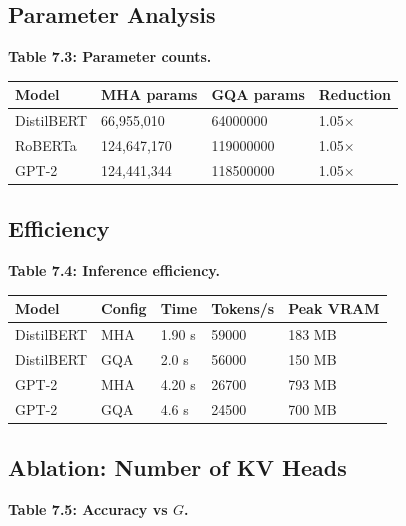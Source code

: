\subsection{Parameter Analysis}

\textbf{Table 7.3: Parameter counts.}

\begin{table}[H]
\centering
\small
\begin{tabular}{llll}
\toprule
\textbf{Model} & \textbf{MHA params} & \textbf{GQA params} & \textbf{Reduction} \\
\midrule
DistilBERT & 66,955,010 & 64000000 & 1.05$\times$ \\
RoBERTa & 124,647,170 & 119000000 & 1.05$\times$ \\
GPT-2 & 124,441,344 & 118500000 & 1.05$\times$ \\
\bottomrule
\end{tabular}
\end{table}

\subsection{Efficiency}

\textbf{Table 7.4: Inference efficiency.}

\begin{table}[H]
\centering
\small
\begin{tabular}{lllll}
\toprule
\textbf{Model} & \textbf{Config} & \textbf{Time} & \textbf{Tokens/s} & \textbf{Peak VRAM} \\
\midrule
DistilBERT & MHA & 1.90 s & 59000 & 183 MB \\
DistilBERT & GQA & 2.0 s & 56000 & 150 MB \\
GPT-2 & MHA & 4.20 s & 26700 & 793 MB \\
GPT-2 & GQA & 4.6 s & 24500 & 700 MB \\
\bottomrule
\end{tabular}
\end{table}

\subsection{Ablation: Number of KV Heads}

\textbf{Table 7.5: Accuracy vs $G$.}

